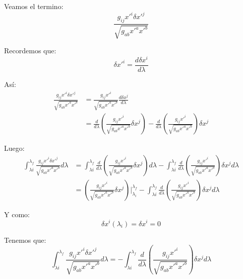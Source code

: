 \documentclass[12pt]{report}
\begin{document}
Veamos el termino:
	\begin{equation*}
		\frac{g_{ij}x'^{i}\delta x'^{j}}{\sqrt{g_{ab}x'^{a}x'^{b}}}
	\end{equation*}

Recordemos que:
	\begin{equation*}
		\delta x'^{i} = \frac{d \delta x^{i}}{d\lambda}
	\end{equation*}

As\'i:
	\begin{align*}
		\frac{g_{ij}x'^{i}\delta x'^{j}}{\sqrt{g_{ab}x'^{a}x'^{b}}} &= \frac{g_{ij}x'^{i}}{\sqrt{g_{ab}x'^{a}x'^{b}}}\frac{d \delta x^{j}}{d\lambda} \\
																	&= \frac{d}{d\lambda} \left(\frac{g_{ij}x'^{i}}{\sqrt{g_{ab}x'^{a}x'^{b}}} \delta x^{j}\right) 
																	 - \frac{d}{d\lambda} \left( \frac{g_{ij}x'^{i}}{\sqrt{g_{ab}x'^{a}x'^{b}}} \right)\delta x^{j}
	\end{align*}
	
Luego:
	\begin{align*}
		\int^{\lambda_{f}}_{\lambda{i}} \frac{g_{ij}x'^{i}\delta x'^{j}}{\sqrt{g_{ab}x'^{a}x'^{b}}} d\lambda
			&= \int^{\lambda_{f}}_{\lambda{i}} \frac{d}{d\lambda} \left(\frac{g_{ij}x'^{i}}{\sqrt{g_{ab}x'^{a}x'^{b}}} \delta x^{j}\right) d\lambda
			 - \int^{\lambda_{f}}_{\lambda{i}} \frac{d}{d\lambda} \left( \frac{g_{ij}x'^{i}}{\sqrt{g_{ab}x'^{a}x'^{b}}} \right)\delta x^{j} d\lambda \\
			&= \left( \frac{g_{ij}x'^{i}}{\sqrt{g_{ab}x'^{a}x'^{b}}} \delta x^{j} \right) \Big|^{\lambda_{f}}_{\lambda_{i}} 
			- \int^{\lambda_{f}}_{\lambda{i}} \frac{d}{d\lambda} \left( \frac{g_{ij}x'^{i}}{\sqrt{g_{ab}x'^{a}x'^{b}}} \right) \delta x^{j} d\lambda
	\end{align*}
	
Y como:
	\begin{equation*}
		\delta x^{i} (\lambda_{i}) = \delta x^{i} = 0
	\end{equation*}

Tenemos que:
	\begin{equation*}
		\int^{\lambda_{f}}_{\lambda{i}} \frac{g_{ij}x'^{i}\delta x'^{j}}{\sqrt{g_{ab}x'^{a}x'^{b}}} d\lambda
			= - \int^{\lambda_{f}}_{\lambda{i}} \frac{d}{d\lambda} \left( \frac{g_{ij}x'^{i}}{\sqrt{g_{ab}x'^{a}x'^{b}}} \right) \delta x^{j} d\lambda
	\end{equation*}
		
\end{document}
